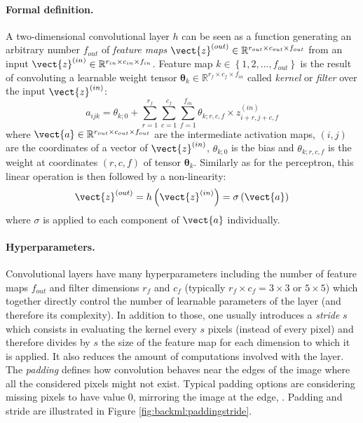 \paragraph{Formal definition.} A two-dimensional convolutional layer $h$ can be seen as 
a function generating an arbitrary number $f_{out}$ of \textit{feature maps}
$\vect{z}^{(out)} \in \mathbb{R}^{r_{out} \times c_{out} \times f_{out}}$ from an input
$\vect{z}^{(in)} \in \mathbb{R}^{r_{in} \times c_{in} \times f_{in}}$. Feature
map $k \in \left\{1, 2, ..., f_{out}\right\}$ is the result of convoluting a
learnable weight tensor $\pmb{\theta}_k \in \mathbb{R}^{r_f \times c_f \times f_{in}}$
called \textit{kernel} or \textit{filter} over the input $\vect{z}^{(in)}$:
\begin{equation}
\label{eqn:backml:convnet}
a_{ijk} = \theta_{k;0} + \sum_{r=1}^{r_f} \sum_{c=1}^{c_f} \sum_{f=1}^{f_{in}} \theta_{k;r,c,f} \times z^{(in)}_{i+r,j+c,f}
\end{equation}
where $\vect{a} \in \mathbb{R}^{r_{out} \times c_{out} \times f_{out}}$ are the intermediate activation maps, $(i, j)$ are the coordinates of a vector of $\vect{z}^{(in)}$, $\theta_{k;0}$
is the bias and $\theta_{k;r,c,f}$ is the weight at coordinates $(r,c,f)$
of tensor $\pmb{\theta}_k$. Similarly 
as for the perceptron, this linear operation is then followed by a non-linearity:
\begin{equation}
\label{eqn:backml:convnetwithactiv}
\vect{z}^{(out)} = h\left(\vect{z}^{(in)}\right) = \sigma\left(\vect{a}\right)
\end{equation}
where $\sigma$ is applied to each component of $\vect{a}$ individually. 

\paragraph{Hyperparameters.} Convolutional layers have many hyperparameters including the number of feature
maps $f_{out}$ and filter dimensions $r_f$ and $c_f$ (typically $r_f \times c_f = 3 \times 3$
or $5 \times 5$) which together directly control the number of learnable parameters
of the layer (and therefore its complexity). In addition to those, one usually introduces a 
\textit{stride} $s$ which consists in evaluating the kernel every $s$ pixels (instead of
every pixel) and therefore divides by $s$ the size of the feature map for each dimension 
to which it is applied. It also reduces the amount of computations involved with the layer. 
The \textit{padding} defines how convolution behaves near the edges of the image where
all the considered pixels might not exist. Typical padding options are considering
missing pixels to have value 0, mirroring the image at the edge, \etc. Padding
and stride are illustrated in Figure \ref{fig:backml:paddingstride}.

